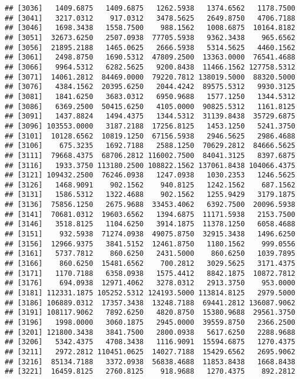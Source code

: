 \documentclass[]{article}
\begin{document}
\begin{verbatim}
## [3036]   1409.6875   1409.6875   1262.5938   1374.6562   1178.7500
## [3041]   3217.0312    917.0312   3478.5625   2649.8750   4706.7188
## [3046]   1698.3438   1558.7500    988.1562   1008.6875  10164.8182
## [3051]  32673.6250   2507.0938  77705.5938   9362.3438    965.6562
## [3056]  21895.2188   1465.0625   2666.5938   5314.5625   4460.1562
## [3061]   2498.8750   1690.5312  47809.2500  13363.0000  76541.4688
## [3066]   9964.5312   6282.5625   9200.8438  11466.1562 127758.5312
## [3071]  14061.2812  84469.0000  79220.7812 138019.5000  88320.5000
## [3076]   4384.1562  20395.6250   2044.4242  89575.5312   9930.3125
## [3081]   1841.6250   3683.0312   6950.9688   1577.1250   1344.5312
## [3086]   6369.2500  50415.6250   4105.0000  90825.5312   1161.8125
## [3091]   1437.8824   1494.4375   1344.5312  31139.8438  35729.6875
## [3096] 103553.0000   3187.2188  17256.8125   1453.1250   5241.3750
## [3101]  10128.6562  10819.1250  67156.5938   2946.5625   2986.4688
## [3106]    675.3235   1692.7188   2588.1250  70629.2812  84666.5625
## [3111]  79668.4375  68706.2812 116002.7500  84041.3125   8397.6875
## [3116]   1933.3750 113180.2500 108822.1562 137061.8438 104066.4375
## [3121] 109432.2500  76246.0938   1247.0938   1030.2353   1246.5625
## [3126]   1468.9091    902.1562    940.8125   1242.1562    687.1562
## [3131]   1586.5312   1322.4688    902.1562   1255.9429   3179.1875
## [3136]  75856.1250   2675.9688  33453.4062   6392.7500  20096.5938
## [3141]  70681.0312  19603.6562   1394.6875  11171.5938   2153.7500
## [3146]   3518.8125   1104.6250   3914.1875  11378.1250   6058.4688
## [3151]    932.5938  71274.0938  49075.8750  32915.3438   1496.6250
## [3156]  12966.9375   3841.5152  12461.8750   1180.1562    999.0556
## [3161]   5737.7812    860.6250   2431.5000    860.6250   1039.7895
## [3166]    860.6250  15481.6562    700.2812   3029.5625   3171.4375
## [3171]   1170.7188   6358.0938   1575.4412   8842.1875  10872.7812
## [3176]    694.0938  12971.4062   3278.0312   2913.3750    953.0000
## [3181] 112331.1875 105252.5312 124193.5000 113814.8125   2979.5000
## [3186] 106889.0312  17357.3438  13248.7188  69441.2812 136087.9062
## [3191] 108117.9062   7892.6250   4820.8750  15380.9688  29561.3750
## [3196]   1998.0000   3060.1875   2945.0000  39559.8750   2366.2500
## [3201] 121800.3438   3841.7500   2800.0938   5617.6250   2288.9688
## [3206]   5342.4375   4708.3438   1116.9091  15594.6875   1270.4375
## [3211]   2972.2812 110451.0625  14027.7188  15429.6562   2695.9062
## [3216]  85134.7188   3372.0938  56838.4688  11853.8438   1668.8438
## [3221]  16459.8125   2760.8125    918.9688   1270.4375    892.2812

\end{verbatim}
\end{document}
